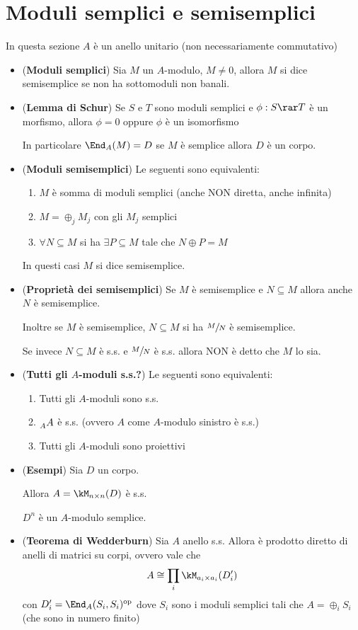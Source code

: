 \documentclass[a4paper,NoNotes,GeneralMath]{stdmdoc}
\begin{document}
\section*{Moduli semplici e semisemplici}
In questa sezione $A$ è un anello unitario (non necessariamente
commutativo)

\begin{itemize}
\item ({\bf Moduli semplici}) Sia $M$ un $A$-modulo, $M \neq 0$, allora
  $M$ si dice semisemplice se non ha sottomoduli non banali.
\item ({\bf Lemma di Schur}) Se $S$ e $T$ sono moduli semplici e
  $\phi: S \rar T$ è un morfismo, allora $\phi = 0$ oppure $\phi$ è un
  isomorfismo

  In particolare $\End_A (M) = D$ se $M$ è semplice allora $D$ è un
  corpo.
\item ({\bf Moduli semisemplici}) Le seguenti sono equivalenti:
  \begin{enumerate}
  \item $M$ è somma di moduli semplici (anche NON diretta, anche
    infinita)
  \item $M = \oplus_j M_j$ con gli $M_j$ semplici
  \item $\forall N \subseteq M$ si ha $\exists P \subseteq M$ tale che
    $N \oplus P = M$
  \end{enumerate}
  In questi casi $M$ si dice semisemplice.
\item ({\bf Proprietà dei semisemplici}) Se $M$ è semisemplice e $N
  \subseteq M$ allora anche $N$ è semisemplice.

  Inoltre se $M$ è semisemplice, $N \subseteq M$ si ha $\sfrac{M}{N}$ è
  semisemplice.

  Se invece $N \subseteq M$ è s.s. e $\sfrac{M}{N}$ è s.s. allora NON è
  detto che $M$ lo sia.
\item ({\bf Tutti gli $A$-moduli s.s.?}) Le seguenti sono equivalenti:
  \begin{enumerate}
  \item Tutti gli $A$-moduli sono s.s.
  \item $\prescript{}{A}{A}$ è s.s. (ovvero $A$ come $A$-modulo sinistro
    è s.s.)
  \item Tutti gli $A$-moduli sono proiettivi
  \end{enumerate}
\item ({\bf Esempi}) Sia $D$ un corpo.

  Allora $A = \kM_{n\times n}(D)$ è s.s.

  $D^n$ è un $A$-modulo semplice.
\item ({\bf Teorema di Wedderburn}) Sia $A$ anello s.s. Allora è
  prodotto diretto di anelli di matrici su corpi, ovvero vale che
  $$ A \cong \prod_i \kM_{a_i \times a_i}(D_i') $$
  con $D_i' = \End_A (S_i, S_i)^{\text{op}}$ dove $S_i$ sono i moduli
  semplici tali che $A = \oplus_i S_i$ (che sono in numero finito)
\end{itemize}
\end{document}
